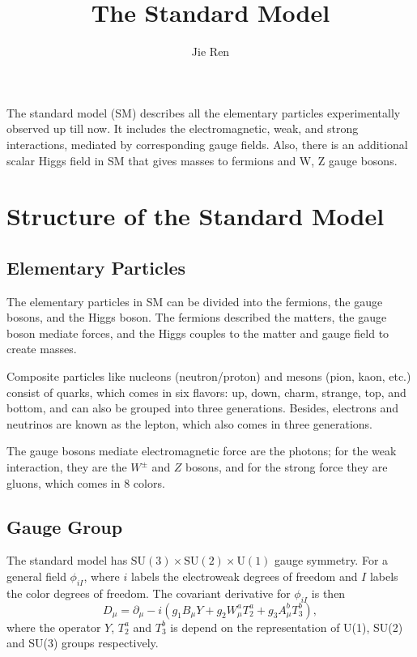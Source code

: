 \documentclass[aps,prb,superscriptaddress,nofootinbib]{revtex4}
\begin{document}
\title{The Standard Model}
\author{Jie Ren}



\maketitle

The standard model (SM) describes all the elementary particles experimentally observed up till now.
It includes the electromagnetic, weak, and strong interactions, mediated by corresponding gauge fields.
Also, there is an additional scalar Higgs field in SM that gives masses to fermions and W, Z gauge bosons.

\tableofcontents


\section{Structure of the Standard Model}




\subsection{Elementary Particles}

The elementary particles in SM can be divided into the fermions, the gauge bosons, and the Higgs boson. 
The fermions described the matters, the gauge boson mediate forces, and the Higgs couples to the matter and gauge field to create masses.

Composite particles like nucleons (neutron/proton) and mesons (pion, kaon, etc.) consist of quarks, which comes in six flavors: up, down, charm, strange, top, and bottom, and can also be grouped into three generations.
Besides, electrons and neutrinos are known as the lepton, which also comes in three generations.

The gauge bosons mediate electromagnetic force are the photons; for the weak interaction, they are the $W^\pm$ and $Z$ bosons, and for the strong force they are gluons, which comes in 8 colors.





\subsection{Gauge Group}

The standard model has $\mathrm{SU(3)}\times\mathrm{SU(2)}\times\mathrm{U(1)}$ gauge symmetry.
For a general field $\phi_{iI}$, where $i$ labels the electroweak degrees of freedom and $I$ labels the color degrees of freedom.
The covariant derivative for $\phi_{iI}$ is then
\begin{equation}
	D_\mu = \partial_\mu -i \left(g_1 B_\mu Y + g_2 W^a_\mu T^a_{2} + g_3 A_\mu^b T^b_3                                                  \right),
\end{equation}
where the operator $Y$, $T_2^a$ and $T_3^b$ is depend on the representation of U(1), SU(2) and SU(3) groups respectively. 
\end{document}
